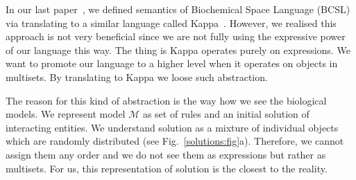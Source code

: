 \documentclass{elsarticle}
\begin{document}
In our last paper~\cite{Ded201627}, we defined semantics of Biochemical Space Language (BCSL) via translating to a similar language called Kappa~\cite{Kappa}. However, we realised this approach is not very beneficial since we are not fully using the expressive power of our language this way. The thing is Kappa operates purely on expressions. We want to promote our language to a higher level when it operates on objects in multisets. By translating to Kappa we loose such abstraction. 

The reason for this kind of abstraction is the way how we see the biological models. We represent model $\mathcal{M}$ as set of rules and an initial solution of interacting entities. We understand solution as a mixture of individual objects which are randomly distributed (see Fig.~\ref{solutions:fig}a). Therefore, we cannot assign them any order and we do not see them as expressions but rather as multisets. For us, this representation of solution is the closest to the reality.
\end{document}
